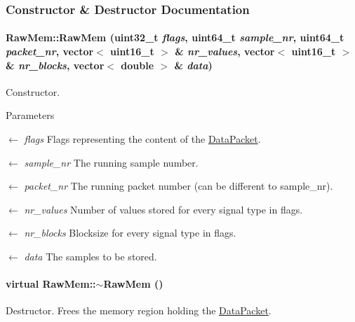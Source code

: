 \subsubsection{Constructor \& Destructor Documentation}
\hypertarget{class_raw_mem_af74aadbde2ea7d30cd721a7ece0e79d7}{
\paragraph[{RawMem}]{\setlength{\rightskip}{0pt plus 5cm}RawMem::RawMem (uint32\_\-t {\em flags}, \/  uint64\_\-t {\em sample\_\-nr}, \/  uint64\_\-t {\em packet\_\-nr}, \/  vector$<$ uint16\_\-t $>$ \& {\em nr\_\-values}, \/  vector$<$ uint16\_\-t $>$ \& {\em nr\_\-blocks}, \/  vector$<$ double $>$ \& {\em data})}\hfill}
\label{class_raw_mem_af74aadbde2ea7d30cd721a7ece0e79d7}


Constructor. 
\begin{DoxyParams}{Parameters}
\item[\mbox{$\leftarrow$} {\em flags}]Flags representing the content of the \hyperlink{class_data_packet}{DataPacket}. \item[\mbox{$\leftarrow$} {\em sample\_\-nr}]The running sample number. \item[\mbox{$\leftarrow$} {\em packet\_\-nr}]The running packet number (can be different to sample\_\-nr). \item[\mbox{$\leftarrow$} {\em nr\_\-values}]Number of values stored for every signal type in flags. \item[\mbox{$\leftarrow$} {\em nr\_\-blocks}]Blocksize for every signal type in flags. \item[\mbox{$\leftarrow$} {\em data}]The samples to be stored. \end{DoxyParams}
\hypertarget{class_raw_mem_a05eb832829e39e65c31567fa4d419e31}{
\paragraph[{$\sim$RawMem}]{\setlength{\rightskip}{0pt plus 5cm}virtual RawMem::$\sim$RawMem ()}\hfill}
\label{class_raw_mem_a05eb832829e39e65c31567fa4d419e31}


Destructor. Frees the memory region holding the \hyperlink{class_data_packet}{DataPacket}. 

